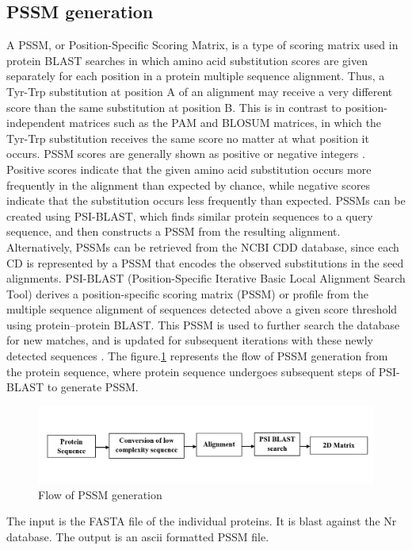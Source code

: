 \documentclass[conference]{IEEEtran}
\begin{document}
\subsection{PSSM generation}
A PSSM, or Position-Specific Scoring Matrix, is a type of scoring matrix used in protein BLAST searches in which amino acid substitution scores are given separately for each position in a protein multiple sequence alignment. Thus, a Tyr-Trp substitution at position A of an alignment may receive a very different score than the same substitution at position B. This is in contrast to position-independent matrices such as the PAM and BLOSUM matrices, in which the Tyr-Trp substitution receives the same score no matter at what position it occurs. PSSM scores are generally shown as positive or negative integers \cite{b7}. Positive scores indicate that the given amino acid substitution occurs more frequently in the alignment than expected by chance, while negative scores indicate that the substitution occurs less frequently than expected. PSSMs can be created using PSI-BLAST, which finds similar protein sequences to a query sequence, and then constructs a PSSM from the resulting alignment. Alternatively, PSSMs can be retrieved from the NCBI CDD database, since each CD is represented by a PSSM that encodes the observed substitutions in the seed alignments. PSI-BLAST (Position-Specific Iterative Basic Local Alignment Search Tool) derives a position-specific scoring matrix (PSSM) or profile from the multiple sequence alignment of sequences detected above a given score threshold using protein–protein BLAST. This PSSM is used to further search the database for new matches, and is updated for subsequent iterations with these newly detected sequences \cite{b10}. The figure.\ref{f3} represents the flow of PSSM generation from the protein sequence, where protein sequence undergoes subsequent steps of PSI-BLAST to generate PSSM.
 
\begin{figure}[htbp]
\centerline{\includegraphics[scale=0.27]{figures/fig3.png}}
\caption{Flow of PSSM generation}
\label{f3}
\end{figure}

The input is the FASTA file of the individual proteins. It is blast against the Nr database. The output is an ascii formatted PSSM file.
\end{document}

